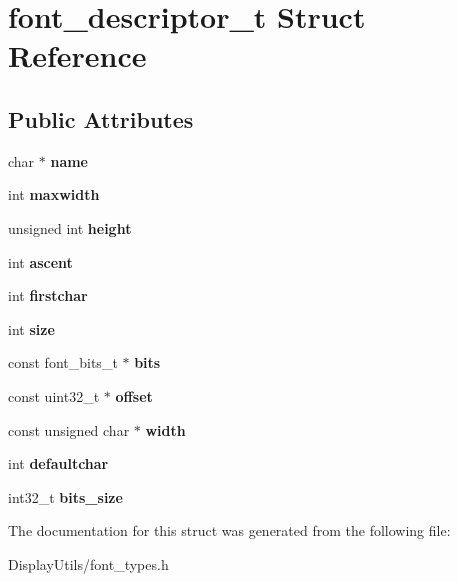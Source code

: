 \hypertarget{structfont__descriptor__t}{}\section{font\+\_\+descriptor\+\_\+t Struct Reference}
\label{structfont__descriptor__t}
\subsection*{Public Attributes}
\begin{DoxyCompactItemize}
\item 
\mbox{\label{structfont__descriptor__t_a7a5f7569c87f8995fe45b207897a0327}} 
char $\ast$ {\bfseries name}
\item 
\mbox{\label{structfont__descriptor__t_a8e21a73982523c96f1ca5f39487956a7}} 
int {\bfseries maxwidth}
\item 
\mbox{\label{structfont__descriptor__t_abf7d9548e4312aa8ab0b6c868c5c4ae3}} 
unsigned int {\bfseries height}
\item 
\mbox{\label{structfont__descriptor__t_af23bcc2d3e1633f8153cb92df31de704}} 
int {\bfseries ascent}
\item 
\mbox{\label{structfont__descriptor__t_a9d7d7a8a663625f6fb6120cb9dc0d970}} 
int {\bfseries firstchar}
\item 
\mbox{\label{structfont__descriptor__t_abe0724754ffd1eefe3933c49c534eb8a}} 
int {\bfseries size}
\item 
\mbox{\label{structfont__descriptor__t_a8d9fbb0fd97c708b08e7f6fe5c866fab}} 
const font\+\_\+bits\+\_\+t $\ast$ {\bfseries bits}
\item 
\mbox{\label{structfont__descriptor__t_aaf4c05aa205048a217620ca26f8c5abb}} 
const uint32\+\_\+t $\ast$ {\bfseries offset}
\item 
\mbox{\label{structfont__descriptor__t_a15c94573c8690a0ec940e3da4c80b0b9}} 
const unsigned char $\ast$ {\bfseries width}
\item 
\mbox{\label{structfont__descriptor__t_a5bfad8f5e932dee64c856bce858f88d0}} 
int {\bfseries defaultchar}
\item 
\mbox{\label{structfont__descriptor__t_a335c226d88f77b41d82ed53d6d28c022}} 
int32\+\_\+t {\bfseries bits\+\_\+size}
\end{DoxyCompactItemize}


The documentation for this struct was generated from the following file\+:\begin{DoxyCompactItemize}
\item 
Display\+Utils/font\+\_\+types.\+h\end{DoxyCompactItemize}
